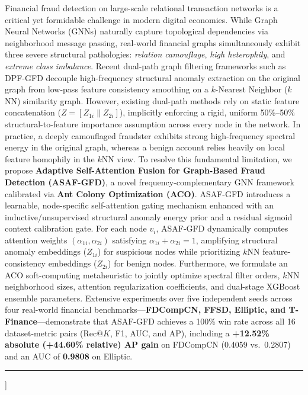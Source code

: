 \documentclass[10pt,a4paper,twocolumn]{article}
\begin{document}
{\begin{minipage}[t]{0.74\textwidth}
{    Financial fraud detection on large-scale relational transaction networks is a critical yet formidable challenge in modern digital economies. While Graph Neural Networks (GNNs) naturally capture topological dependencies via neighborhood message passing, real-world financial graphs simultaneously exhibit three severe structural pathologies: \textit{relation camouflage}, \textit{high heterophily}, and \textit{extreme class imbalance}. Recent dual-path graph filtering frameworks such as DPF-GFD decouple high-frequency structural anomaly extraction on the original graph from low-pass feature consistency smoothing on a $k$-Nearest Neighbor ($k$NN) similarity graph. However, existing dual-path methods rely on static feature concatenation ($Z = [Z_{1i} \parallel Z_{2i}]$), implicitly enforcing a rigid, uniform 50\%--50\% structural-to-feature importance assumption across every node in the network. In practice, a deeply camouflaged fraudster exhibits strong high-frequency spectral energy in the original graph, whereas a benign account relies heavily on local feature homophily in the $k$NN view. To resolve this fundamental limitation, we propose \textbf{Adaptive Self-Attention Fusion for Graph-Based Fraud Detection (ASAF-GFD)}, a novel frequency-complementary GNN framework calibrated via \textbf{Ant Colony Optimization (ACO)}. ASAF-GFD introduces a learnable, node-specific self-attention gating mechanism enhanced with an inductive/unsupervised structural anomaly energy prior and a residual sigmoid context calibration gate. For each node $v_i$, ASAF-GFD dynamically computes attention weights $(\alpha_{1i}, \alpha_{2i})$ satisfying $\alpha_{1i} + \alpha_{2i} = 1$, amplifying structural anomaly embeddings ($Z_{1i}$) for suspicious nodes while prioritizing $k$NN feature-consistency embeddings ($Z_{2i}$) for benign nodes. Furthermore, we formulate an ACO soft-computing metaheuristic to jointly optimize spectral filter orders, $k$NN neighborhood sizes, attention regularization coefficients, and dual-stage XGBoost ensemble parameters. Extensive experiments over five independent seeds across four real-world financial benchmarks---\textbf{FDCompCN, FFSD, Elliptic, and T-Finance}---demonstrate that ASAF-GFD achieves a 100\% win rate across all 16 dataset-metric pairs ($\text{Rec}@K$, F1, AUC, and AP), including a \textbf{+12.52\% absolute (+44.60\% relative) AP gain} on FDCompCN (0.4059 vs.\ 0.2807) and an AUC of \textbf{0.9808} on Elliptic.
    }
  \end{minipage}
  \vspace{8pt}
  \noindent\rule{\textwidth}{1.0pt}
  \vspace{10pt}
}]
\end{document}
